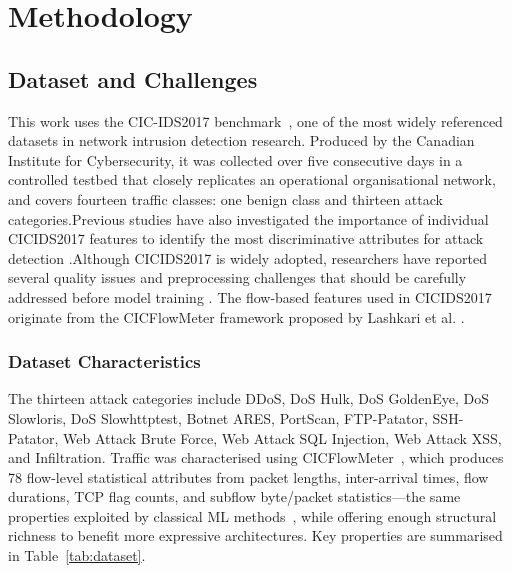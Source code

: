 \documentclass[5p,times]{elsarticle}
\begin{document}
	\section{Methodology}
	\label{sec:methodology}
	
	\subsection{Dataset and Challenges}
	\label{subsec:dataset}
	
	This work uses the CIC-IDS2017 benchmark~\cite{cicids2017}, one of the
	most widely referenced datasets in network intrusion detection
	research. Produced by the Canadian Institute for Cybersecurity, it was
	collected over five consecutive days in a controlled testbed that
	closely replicates an operational organisational network, and covers
	fourteen traffic classes: one benign class and thirteen attack
	categories.Previous studies have also investigated the importance of individual CICIDS2017 features to identify the most discriminative attributes for attack detection \cite{reis2019}.Although CICIDS2017 is widely adopted, researchers have reported several quality issues and preprocessing challenges that should be carefully addressed before model training \cite{engelen2021}.
	The flow-based features used in CICIDS2017 originate from the CICFlowMeter framework proposed by Lashkari et al. \cite{lashkari2017}.
	
	\subsubsection{Dataset Characteristics}
	
	The thirteen attack categories include DDoS, DoS Hulk, DoS GoldenEye,
	DoS Slowloris, DoS Slowhttptest, Botnet ARES, PortScan, FTP-Patator,
	SSH-Patator, Web Attack Brute Force, Web Attack SQL Injection, Web
	Attack XSS, and Infiltration. Traffic was characterised using
	CICFlowMeter~\cite{cicids2017}, which produces 78 flow-level
	statistical attributes from packet lengths, inter-arrival times, flow
	durations, TCP flag counts, and subflow byte/packet statistics---the
	same properties exploited by classical ML methods~\cite{kurniabudi2020,xgb2023},
	while offering enough structural richness to benefit more expressive
	architectures. Key properties are summarised in
	Table~\ref{tab:dataset}.
	
\end{document}
